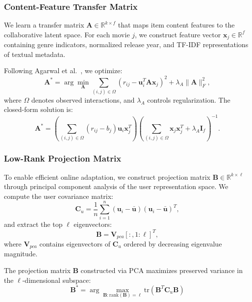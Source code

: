 \documentclass[acmsmall]{acmart}
\begin{document}
\subsubsection{Content-Feature Transfer Matrix}

We learn a transfer matrix $\mathbf{A} \in \mathbb{R}^{k \times f}$ that maps item content features to the collaborative latent space. For each movie $j$, we construct feature vector $\mathbf{x}_j \in \mathbb{R}^f$ containing genre indicators, normalized release year, and TF-IDF representations of textual metadata.

Following Agarwal et al.~\cite{agarwal2010fast}, we optimize:
\begin{equation}
\mathbf{A}^* = \arg\min_{\mathbf{A}} \sum_{(i,j) \in \Omega} \left(r_{ij} - \mathbf{u}_i^T \mathbf{A} \mathbf{x}_j\right)^2 + \lambda_A \|\mathbf{A}\|^2_F,
\label{eq:transfer_matrix}
\end{equation}
where $\Omega$ denotes observed interactions, and $\lambda_A$ controls regularization. The closed-form solution is:
\begin{equation}
\mathbf{A}^* = \left(\sum_{(i,j) \in \Omega} (r_{ij} - b_j) \mathbf{u}_i \mathbf{x}_j^T\right) \left(\sum_{(i,j) \in \Omega} \mathbf{x}_j \mathbf{x}_j^T + \lambda_A \mathbf{I}_f\right)^{-1}.
\label{eq:transfer_solution}
\end{equation}

\subsubsection{Low-Rank Projection Matrix}

To enable efficient online adaptation, we construct projection matrix $\mathbf{B} \in \mathbb{R}^{k \times \ell}$ through principal component analysis of the user representation space. We compute the user covariance matrix:
\begin{equation}
\mathbf{C}_u = \frac{1}{n} \sum_{i=1}^n (\mathbf{u}_i - \bar{\mathbf{u}})(\mathbf{u}_i - \bar{\mathbf{u}})^T,
\label{eq:user_covariance}
\end{equation}
and extract the top $\ell$ eigenvectors:
\begin{equation}
\mathbf{B} = \mathbf{V}_{pca}[:, 1:\ell]^T,
\label{eq:B_matrix_pca}
\end{equation}
where $\mathbf{V}_{pca}$ contains eigenvectors of $\mathbf{C}_u$ ordered by decreasing eigenvalue magnitude.

\begin{theorem}
The projection matrix $\mathbf{B}$ constructed via PCA maximizes preserved variance in the $\ell$-dimensional subspace:
\begin{equation}
\mathbf{B}^* = \arg\max_{\mathbf{B}: \text{rank}(\mathbf{B})=\ell} \text{tr}(\mathbf{B}^T \mathbf{C}_u \mathbf{B})
\end{equation}
\end{theorem}
\end{document}
